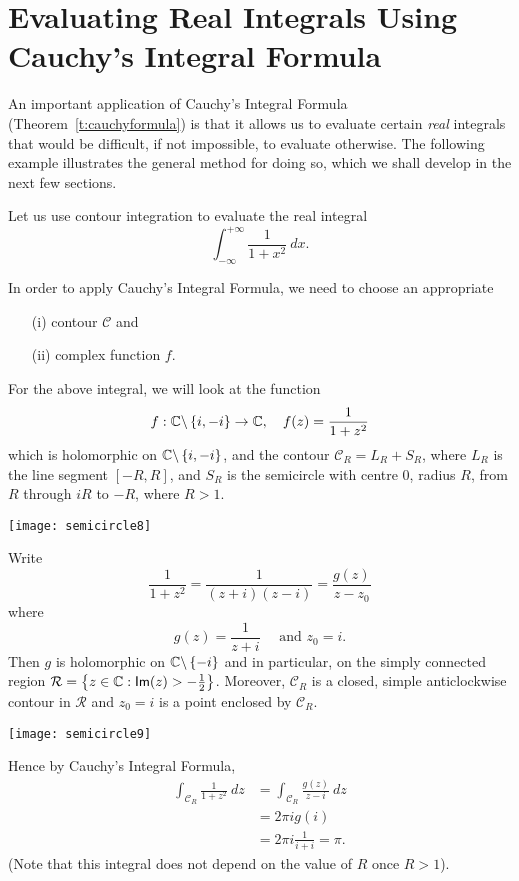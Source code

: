 \section{Evaluating Real Integrals Using Cauchy's Integral Formula}
An important application of Cauchy's Integral Formula (Theorem~\ref{t:cauchyformula}) is that it allows us to evaluate certain \emph{real} integrals that would be difficult, if not impossible, to evaluate otherwise.  The following example illustrates the general method for doing so, which we shall develop in the next few sections.
\begin{example}
\label{e:realint1}
Let us use contour integration to evaluate the real integral
\[
\int_{-\infty}^{+\infty} \frac{1}{1+x^2}\ dx.
\]
\end{example}
In order to apply Cauchy's Integral Formula, we need to choose an appropriate
\begin{itemize}
\item[(i)] contour $\mathcal{C}$ and
\item[(ii)] complex function $f$.
\end{itemize}
For the above integral, we will look at the function
\[
f:\mathbb{C} \backslash \left\{ i,-i\right\} \to \mathbb{C}, \quad f(z) = \frac{1}{1+z^2}
\]
which is holomorphic on $\mathbb{C} \backslash \left\{i,-i\right\}$, and the contour $\mathcal{C}_R = L_R + S_R$, where $L_R$ is the line segment $[-R,R]$, and $S_R$ is the semicircle with centre $0$, radius $R$, from $R$ through $iR$ to $-R$, where $R>1$.
\begin{center}
\texttt{[image: semicircle8]}
\end{center}
Write
\[
\frac{1}{1+z^2} = \frac{1}{(z+i)(z-i)} = \frac{g(z)}{z-z_0}
\]
where
\[
g(z) = \frac{1}{z+i}\quad \text{ and } z_0=i.
\]
Then $g$ is holomorphic on $\mathbb{C} \backslash \left\{-i\right\}$ and in particular, on the simply connected region $\mathcal{R} = \left\{ z \in \mathbb{C}: \textsf{Im} (z) > - \frac{1}{2}\right\}$.  Moreover, $\mathcal{C}_R$ is a closed, simple anticlockwise contour in $\mathcal{R}$ and $z_0=i$ is a point enclosed by $\mathcal{C}_R$.
\begin{center}
\texttt{[image: semicircle9]}
\end{center}
Hence by Cauchy's Integral Formula,
\begin{align*}
\int_{\mathcal{C}_R} \frac{1}{1+z^2}\ dz &= \int_{\mathcal{C}_R} \frac{g(z)}{z-i}\ dz \\
&= 2 \pi i g(i) \\
& = 2\pi i \frac{1}{i+i} = \pi.
\end{align*}
(Note that  this integral does not depend on the value of $R$ once $R>1$).


